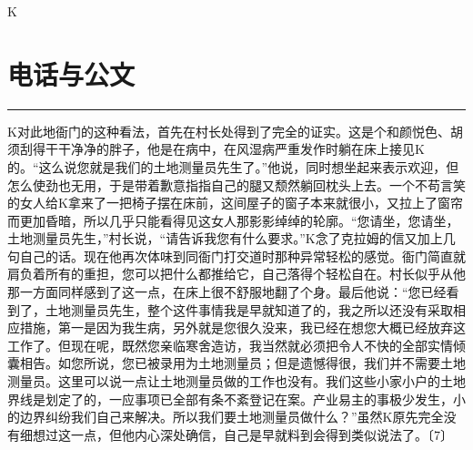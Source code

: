 \documentclass[12pt,a4paper]{article}
\begin{document}
K

\newpage
\section{电话与公文}
\vspace{0.5em}
\vspace{0.3em}

\noindent\rule{\textwidth}{0.4pt}

\vspace{0.3em}



K对此地衙门的这种看法，首先在村长处得到了完全的证实。这是个和颜悦色、胡须刮得干干净净的胖子，他是在病中，在风湿病严重发作时躺在床上接见K的。“这么说您就是我们的土地测量员先生了。”他说，同时想坐起来表示欢迎，但怎么使劲也无用，于是带着歉意指指自己的腿又颓然躺回枕头上去。一个不苟言笑的女人给K拿来了一把椅子摆在床前，这间屋子的窗子本来就很小，又拉上了窗帘而更加昏暗，所以几乎只能看得见这女人那影影绰绰的轮廓。“您请坐，您请坐，土地测量员先生，”村长说，“请告诉我您有什么要求。”K念了克拉姆的信又加上几句自己的话。现在他再次体味到同衙门打交道时那种异常轻松的感觉。衙门简直就肩负着所有的重担，您可以把什么都推给它，自己落得个轻松自在。村长似乎从他那一方面同样感到了这一点，在床上很不舒服地翻了个身。最后他说：“您已经看到了，土地测量员先生，整个这件事情我是早就知道了的，我之所以还没有采取相应措施，第一是因为我生病，另外就是您很久没来，我已经在想您大概已经放弃这工作了。但现在呢，既然您亲临寒舍造访，我当然就必须把令人不快的全部实情倾囊相告。如您所说，您已被录用为土地测量员；但是遗憾得很，我们并不需要土地测量员。这里可以说一点让土地测量员做的工作也没有。我们这些小家小户的土地界线是划定了的，一应事项已全部有条不紊登记在案。产业易主的事极少发生，小的边界纠纷我们自己来解决。所以我们要土地测量员做什么？”虽然K原先完全没有细想过这一点，但他内心深处确信，自己是早就料到会得到类似说法了。〔7〕
\end{document}
